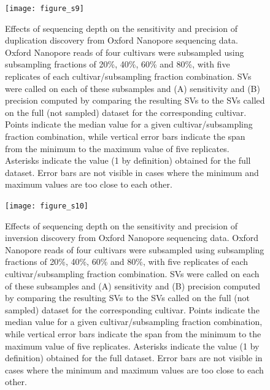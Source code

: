 \documentclass[12pt]{article}
\newenvironment{cfigure}
	{\begin{figure} \centering}
	{\end{figure}}
\begin{document}
\clearpage%

\begin{cfigure}
	\texttt{[image: figure\_s9]}

	\caption[Effects of sequencing depth on the sensitivity and precision of duplication discovery from Oxford Nanopore sequencing data]{
		Effects of sequencing depth on the sensitivity and precision of duplication discovery from Oxford Nanopore sequencing data.
		Oxford Nanopore reads of four cultivars were subsampled using subsampling fractions of 20\%, 40\%, 60\% and 80\%, with five replicates of each cultivar/subsampling fraction combination.
		SVs were called on each of these subsamples and (A) sensitivity and (B) precision computed by comparing the resulting SVs to the SVs called on the full (not sampled) dataset for the corresponding cultivar.
		Points indicate the median value for a given cultivar/subsampling fraction combination, while vertical error bars indicate the span from the minimum to the maximum value of five replicates.
		Asterisks indicate the value (1 by definition) obtained for the full dataset.
		Error bars are not visible in cases where the minimum and maximum values are too close to each other.
}

\label{fig_s9}

\end{cfigure}

\clearpage%

\begin{cfigure}
	\texttt{[image: figure\_s10]}

	\caption[Effects of sequencing depth on the sensitivity and precision of inversion discovery from Oxford Nanopore sequencing data]{
		Effects of sequencing depth on the sensitivity and precision of inversion discovery from Oxford Nanopore sequencing data.
		Oxford Nanopore reads of four cultivars were subsampled using subsampling fractions of 20\%, 40\%, 60\% and 80\%, with five replicates of each cultivar/subsampling fraction combination.
		SVs were called on each of these subsamples and (A) sensitivity and (B) precision computed by comparing the resulting SVs to the SVs called on the full (not sampled) dataset for the corresponding cultivar.
		Points indicate the median value for a given cultivar/subsampling fraction combination, while vertical error bars indicate the span from the minimum to the maximum value of five replicates.
		Asterisks indicate the value (1 by definition) obtained for the full dataset.
		Error bars are not visible in cases where the minimum and maximum values are too close to each other.
}

\label{fig_s10}

\end{cfigure}
\end{document}
